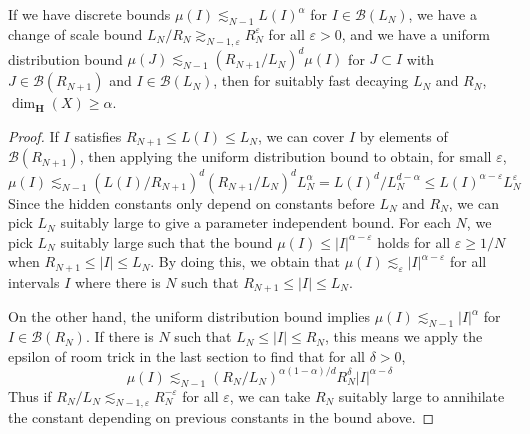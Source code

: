\begin{theorem}
    If we have discrete bounds $\mu(I) \lesssim_{N-1} L(I)^\alpha$ for $I \in \mathcal{B}(L_N)$, we have a change of scale bound $L_N/R_N \gtrsim_{N-1,\varepsilon} R_N^\varepsilon$ for all $\varepsilon > 0$, and we have a uniform distribution bound $\mu(J) \lesssim_{N-1} (R_{N+1}/L_N)^d \mu(I)$ for $J \subset I$ with $J \in \mathcal{B}(R_{N+1})$ and $I \in \mathcal{B}(L_N)$, then for suitably fast decaying $L_N$ and $R_N$, $\dim_{\mathbf{H}}(X) \geq \alpha$.
\end{theorem}
\begin{proof}
    If $I$ satisfies $R_{N+1} \leq L(I) \leq L_N$, we can cover $I$ by elements of $\mathcal{B}(R_{N+1})$, then applying the uniform distribution bound to obtain, for small $\varepsilon$,
    \[ \mu(I) \lesssim_{N-1} (L(I)/R_{N+1})^d (R_{N+1}/L_N)^d L_N^\alpha = L(I)^d / L_N^{d-\alpha} \leq L(I)^{\alpha-\varepsilon} L_N^\varepsilon \]
    Since the hidden constants only depend on constants before $L_N$ and $R_N$, we can pick $L_N$ suitably large to give a parameter independent bound. For each $N$, we pick $L_N$ suitably large such that the bound $\mu(I) \leq |I|^{\alpha - \varepsilon}$ holds for all $\varepsilon \geq 1/N$ when $R_{N+1} \leq |I| \leq L_N$. By doing this, we obtain that $\mu(I) \lesssim_\varepsilon |I|^{\alpha - \varepsilon}$ for all intervals $I$ where there is $N$ such that $R_{N+1} \leq |I| \leq L_N$.

    On the other hand, the uniform distribution bound implies $\mu(I) \lesssim_{N-1} |I|^\alpha$ for $I \in \mathcal{B}(R_N)$. If there is $N$ such that $L_N \leq |I| \leq R_N$, this means we apply the epsilon of room trick in the last section to find that for all $\delta > 0$,
%
\[ \mu(I) \lesssim_{N-1} \left( R_N/L_N \right)^{\alpha(1 - \alpha)/d} R_N^\delta |I|^{\alpha - \delta} \]
%
Thus if $R_N/L_N \lesssim_{N-1,\varepsilon} R_N^{-\varepsilon}$ for all $\varepsilon$, we can take $R_N$ suitably large to annihilate the constant depending on previous constants in the bound above.
\end{proof}



